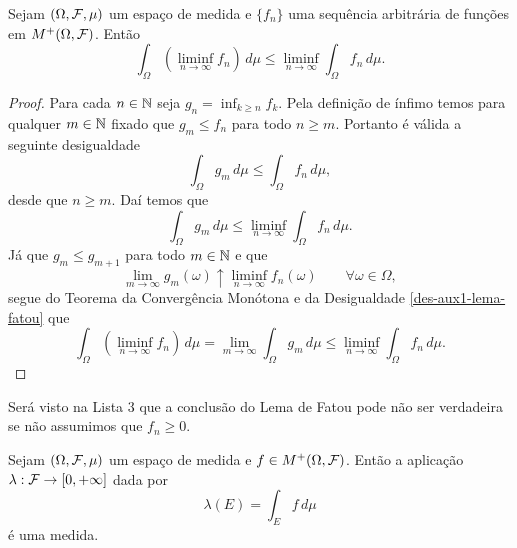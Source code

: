 \begin{lema}
Sejam $(\Omega,\mathcal{F},\mu)$ um espaço de medida e 
$\{f_n\}$ uma sequência arbitrária de 
funções em $M^+(\Omega,\mathcal{F})$. Então 
	\[
		\int_{\Omega}\left( \liminf_{n\to\infty} f_n\right) \, d\mu
		\leq
		\liminf_{n\to\infty} \int_{\Omega}f_n\, d\mu.
	\]
\end{lema}


\begin{proof}
Para cada $n\in\mathbb{N}$ seja $g_n =\inf_{k\geq n} f_k$.
Pela definição de ínfimo temos para
qualquer $m\in \mathbb{N}$ fixado que $g_m\leq f_n$
para todo $n\geq m$. Portanto é válida a 
seguinte desigualdade
	\[
	\int_{\Omega} g_m\, d\mu
	\leq
	\int_{\Omega} f_n\, d\mu,
	\] 
desde que $n\geq m$. Daí temos que
	\begin{equation}\label{des-aux1-lema-fatou}
	\int_{\Omega} g_m\, d\mu
	\leq
	\liminf_{n\to\infty}\int_{\Omega} f_n\, d\mu.
	\end{equation} 
Já que $g_{m}\leq g_{m+1}$ para todo $m\in\mathbb{N}$ 
e que 
\[	
	\lim_{m\to\infty} g_m(\omega) 
	\uparrow 
	\liminf_{n\to\infty} f_n(\omega)
	\qquad
	\forall \omega\in\Omega,
\]
segue do Teorema da Convergência Monótona e 
da Desigualdade \eqref{des-aux1-lema-fatou} que 
\[
	\int_{\Omega} \left( \liminf_{n\to\infty} f_n\right) \, d\mu
	=
	\lim_{m\to\infty}\int_{\Omega} g_m\, d\mu
	\leq
	\liminf_{n\to\infty}\int_{\Omega} f_n\, d\mu.
\]
\end{proof}






\begin{observacao}
Será visto na Lista 3 que a conclusão do Lema 
de Fatou pode não ser verdadeira se não assumimos que 
$f_n\geq 0$.
\end{observacao}





\begin{corolario}\label{cor-lambda(E)-eh-uma-medida}
Sejam $(\Omega,\mathcal{F},\mu)$ um espaço de medida e 
$f\in M^{+}(\Omega,\mathcal{F})$. Então a aplicação 
$\lambda:\mathcal{F}\to[0,+\infty]$ dada por
	\[
		\lambda(E) 
		=
		\int_{E} f\, d\mu
	\]
é uma medida.
\end{corolario}


